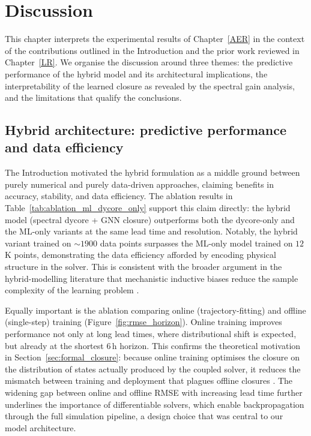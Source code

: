 \chapter{Discussion}
\label{Discussion}

This chapter interprets the experimental results of Chapter~\ref{AER} in the context of the contributions outlined in the Introduction and the prior work reviewed in Chapter~\ref{LR}. We organise the discussion around three themes: the predictive performance of the hybrid model and its architectural implications, the interpretability of the learned closure as revealed by the spectral gain analysis, and the limitations that qualify the conclusions.

\section{Hybrid architecture: predictive performance and data efficiency}

The Introduction motivated the hybrid formulation as a middle ground between purely numerical and purely data-driven approaches, claiming benefits in accuracy, stability, and data efficiency. The ablation results in Table~\ref{tab:ablation_ml_dycore_only} support this claim directly: the hybrid model (spectral dycore + GNN closure) outperforms both the dycore-only and the ML-only variants at the same lead time and resolution. Notably, the hybrid variant trained on $\sim\!1900$ data points surpasses the ML-only model trained on $12$K points, demonstrating the data efficiency afforded by encoding physical structure in the solver. This is consistent with the broader argument in the hybrid-modelling literature that mechanistic inductive biases reduce the sample complexity of the learning problem \citep{Kashinath2021, Meng2025, Kochkov2021}.

Equally important is the ablation comparing online (trajectory-fitting) and offline (single-step) training (Figure~\ref{fig:rmse_horizon}). Online training improves performance not only at long lead times, where distributional shift is expected, but already at the shortest 6\,h horizon. This confirms the theoretical motivation in Section~\ref{sec:formal_closure}: because online training optimises the closure on the distribution of states actually produced by the coupled solver, it reduces the mismatch between training and deployment that plagues offline closures \citep{kurz2021investigating, brenowitz2019spatially}. The widening gap between online and offline RMSE with increasing lead time further underlines the importance of differentiable solvers, which enable backpropagation through the full simulation pipeline, a design choice that was central to our model architecture.

